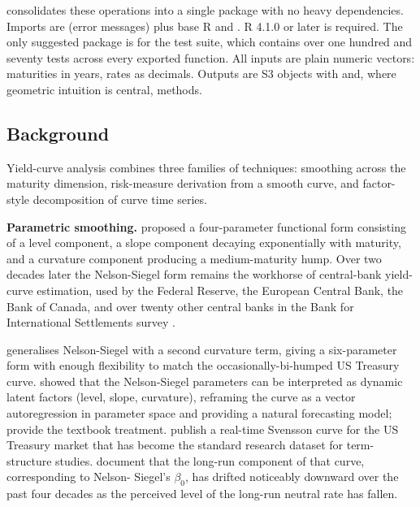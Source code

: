  consolidates these operations into a single
package with no heavy dependencies. Imports are  (error
messages) plus base R  and . R 4.1.0 or later
is required. The only suggested package is  for the
test suite, which contains over one hundred and seventy tests across
every exported function. All inputs are plain numeric vectors:
maturities in years, rates as decimals. Outputs are S3 objects with
 and, where geometric intuition is central, 
methods.

\subsection{Background}\label{background}

Yield-curve analysis combines three families of techniques: smoothing
across the maturity dimension, risk-measure derivation from a smooth
curve, and factor-style decomposition of curve time series.

\textbf{Parametric smoothing.} \citet{nelson1987parsimonious} proposed a
four-parameter functional form consisting of a level component, a slope
component decaying exponentially with maturity, and a curvature
component producing a medium-maturity hump. Over two decades later the
Nelson-Siegel form remains the workhorse of central-bank yield-curve
estimation, used by the Federal Reserve, the European Central Bank, the
Bank of Canada, and over twenty other central banks in the Bank for
International Settlements survey \citep{bis2005zero}.

\citet{svensson1994estimating} generalises Nelson-Siegel with a second
curvature term, giving a six-parameter form with enough flexibility to
match the occasionally-bi-humped US Treasury curve.
\citet{diebold2006forecasting} showed that the Nelson-Siegel parameters
can be interpreted as dynamic latent factors (level, slope, curvature),
reframing the curve as a vector autoregression in parameter space and
providing a natural forecasting model; \citet{diebold2013yield} provide
the textbook treatment. \citet{gurkaynak2007us} publish a real-time
Svensson curve for the US Treasury market that has become the standard
research dataset for term-structure studies. \citet{bauer2020interest}
document that the long-run component of that curve, corresponding to
Nelson- Siegel's \(\beta_0\), has drifted noticeably downward over the
past four decades as the perceived level of the long-run neutral rate
has fallen.

